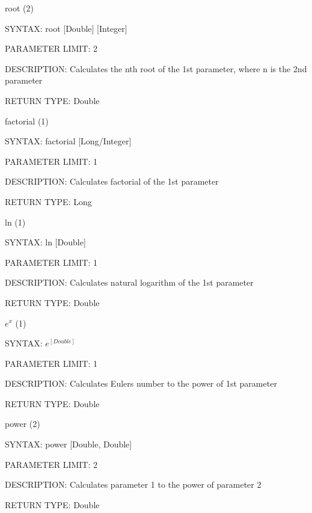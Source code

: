 \documentclass[a4paper]{article}
\begin{document}
\begin{flushleft}
root (2)
\begin{compactitem}
  \item [] SYNTAX: root [Double] [Integer]
  \item [] PARAMETER LIMIT: 2
  \item [] DESCRIPTION: Calculates the nth root of the 1st parameter, where n is
               the 2nd parameter
  \item [] RETURN TYPE: Double
\end{compactitem}
\medskip

factorial (1)
\begin{compactitem}
  \item [] SYNTAX: factorial [Long/Integer]
  \item [] PARAMETER LIMIT: 1
  \item [] DESCRIPTION: Calculates factorial of the 1st parameter
  \item [] RETURN TYPE: Long
\end{compactitem}
\medskip

ln (1)
\begin{compactitem}
  \item [] SYNTAX: ln [Double]
  \item [] PARAMETER LIMIT: 1
  \item [] DESCRIPTION: Calculates natural logarithm of the 1st parameter
  \item [] RETURN TYPE: Double
\end{compactitem}
\medskip

$e^x$ (1)
\begin{compactitem}
  \item [] SYNTAX: $e^[Double]$
  \item [] PARAMETER LIMIT: 1
  \item [] DESCRIPTION: Calculates Eulers number to the power of 1st parameter
  \item [] RETURN TYPE: Double
\end{compactitem}
\medskip

power (2)
\begin{compactitem}
  \item [] SYNTAX: power [Double, Double]
  \item [] PARAMETER LIMIT: 2
  \item [] DESCRIPTION: Calculates parameter 1 to the power of parameter 2
  \item [] RETURN TYPE: Double
\end{compactitem}
\medskip

\end{flushleft}

\clearpage
\glsaddallunused
\printnoidxglossaries
\end{document}
